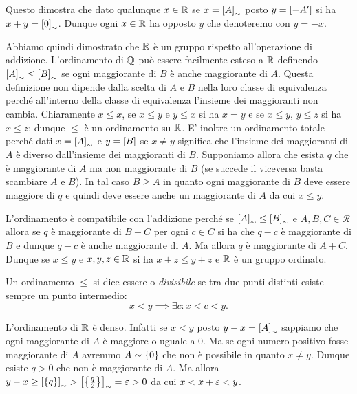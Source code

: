 Questo dimostra che dato qualunque $x\in {\mathbb R}$ se $x={\left[ A \right]}_\sim$
posto $y={\left[ -A' \right]}$ si ha $x+y={\left[ 0 \right]}_\sim$.
Dunque ogni $x\in {\mathbb R}$ ha opposto $y$ che denoteremo 
con $y=-x$.

Abbiamo quindi dimostrato che ${\mathbb R}$ è un gruppo rispetto all'operazione 
di addizione. L'ordinamento di ${\mathbb Q}$ può essere facilmente esteso a ${\mathbb R}$
definendo ${\left[ A \right]}_\sim \le {\left[ B \right]}_\sim$ se ogni maggiorante di $B$ 
è anche maggiorante di $A$. Questa definizione non dipende dalla scelta 
di $A$ e $B$ nella loro classe di equivalenza perché all'interno della classe di 
equivalenza l'insieme dei maggioranti 
non cambia.
Chiaramente $x\le x$, se $x\le y$ e $y\le x$ si ha $x=y$ 
e se $x\le y$, $y\le z$ si ha $x\le z$: dunque $\le$ è un ordinamento su ${\mathbb R}$.
E' inoltre un ordinamento totale perché dati $x={\left[ A \right]}_\sim$ e 
$y={\left[ B \right]}$ se $x\neq y$ significa che l'insieme dei maggioranti 
di $A$ è diverso dall'insieme dei maggioranti di $B$. 
Supponiamo allora che esista $q$ che è maggiorante di $A$ 
ma non maggiorante di $B$ (se succede il viceversa basta scambiare $A$ e $B$).
In tal caso $B\ge A$ in quanto ogni maggiorante di $B$ deve essere maggiore 
di $q$ e quindi deve essere anche un maggiorante di $A$ da cui $x\le y$. 

L'ordinamento è compatibile con l'addizione perché se ${\left[ A \right]}_\sim 
\le {\left[ B \right]}_\sim$ e $A,B,C\in \mathcal R$ 
allora se $q$ è maggiorante di $B+C$ per ogni $c\in C$ si ha che $q-c$ 
è maggiorante di $B$ e dunque $q-c$ è anche maggiorante di $A$.
Ma allora $q$ è maggiorante di $A+C$. Dunque se $x\le y$ e $x,y,z\in {\mathbb R}$ 
si ha $x+z\le y+z$ e ${\mathbb R}$ è un gruppo ordinato.

\begin{definition}
  Un ordinamento $\le$ si dice essere
   o \emph{divisibile} 
  se tra due punti distinti esiste sempre un punto intermedio:
  \[
   x < y \implies \exists c \colon x < c < y.
  \]
\end{definition}
  
L'ordinamento di ${\mathbb R}$ è denso. Infatti se $x<y$ posto $y-x={\left[ A \right]}_\sim$ 
sappiamo che ogni maggiorante di $A$ è maggiore o uguale a $0$.
Ma se ogni numero positivo fosse maggiorante di $A$ avremmo $A\sim{\left\{ 0 \right\}}$
che non è possibile in quanto $x\neq y$. Dunque esiste $q>0$ 
che non è maggiorante di $A$. 
Ma allora $y-x \ge {\left[ {\left\{ q \right\}} \right]}_\sim > {\left[ {\left\{ \frac q 2 \right\}} \right]}_\sim = \varepsilon > 0$
da cui $x<x+\varepsilon<y$.

